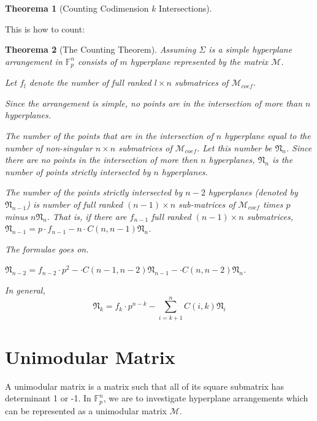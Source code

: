 \documentclass[12pt, a4paper]{article}
\newtheorem{theorem}{Theorema}[subsection]
\theoremstyle{definition}
\theoremstyle{remark}
\begin{document}
\begin{theorem}[Counting Codimension $k$ Intersections]
	
\end{theorem}

This is how to count:

\begin{theorem}[The Counting Theorem]
	Assuming $\Sigma$ is a simple hyperplane arrangement in $\mathbb{F}_p^n$ consists of $m$ hyperplane represented by the matrix $\mathcal{M}$. 

	Let $f_{l}$ denote the number of full ranked $l \times n
	$ submatrices of $\mathcal{M}_{coef}$.

	Since the arrangement is simple, no points are in the intersection of more than $n$ hyperplanes. 

	The number of the points that are in the intersection of $n$ hyperplane equal to the number of non-singular $n \times n$ submatrices of $\mathcal{M}_{coef}$. Let this number be $\mathfrak{N}_n$. Since there are no points in the intersection of more then $n$ hyperplanes, $\mathfrak{N}_n$ is the number of points strictly intersected by $n$ hyperplanes. 

	The number of the points strictly intersected by $n-2$ hyperplanes (denoted by $\mathfrak{N}_{n-1}$) is number of full ranked $(n-1) \times n$ sub-matrices of $\mathcal{M}_{coef}$ times $p$ minus  $n\mathfrak{N}_{n}$. That is, if there are $f_{n-1}$ full ranked $(n-1) \times n$ submatrices, $\mathfrak{N}_{n-1} = p \cdot f_{n-1} - n \cdot C(n, n-1) \mathfrak{N}_n$.

	The formulae goes on.

	$\mathfrak{N}_{n-2} = f_{n-2} \cdot p^2 -  \cdot C(n-1, n-2) \mathfrak{N}_{n-1} - \cdot C(n, n-2) \mathfrak{N}_{n}$.

	In general, 
	\begin{equation}
		\mathfrak{N}_{k} = f_{k} \cdot p^{n-k} - \sum_{i = k+1}^{n} C(i, k) \mathfrak{N}_{i}
	\end{equation}
\end{theorem}

\section{Unimodular Matrix}

A unimodular matrix is a matrix such that all of its square submatrix has determinant 1 or -1. In $\mathbb{F}_p^n$, we are to investigate hyperplane arrangements which can be represented as a unimodular matrix $\mathcal{M}$. 
\end{document}

